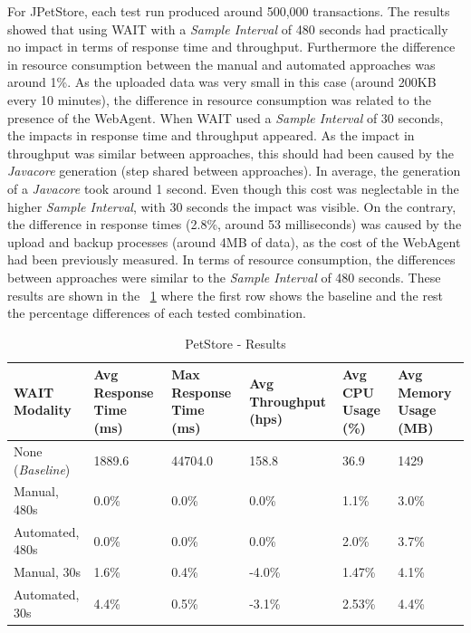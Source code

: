\documentclass[runningheads,a4paper]{llncs}
\begin{document}
For JPetStore, each test run produced around 500,000 transactions. The
results showed that using WAIT with a \emph{Sample Interval} of 480 seconds had
practically no impact in terms of response time and throughput. Furthermore the
difference in resource consumption between the manual and automated approaches
was around 1\%. As the uploaded data was very small in this case (around 200KB
every 10 minutes), the difference in resource consumption was related to the
presence of the WebAgent. When WAIT used a \emph{Sample Interval} of 30 seconds,
the impacts in response time and throughput appeared. As the impact in
throughput was similar between approaches, this should had been caused by the
\emph{Javacore} generation (step shared between approaches). In average, the
generation of a \emph{Javacore} took around 1 second. Even though this cost was
neglectable in the higher \emph{Sample Interval}, with 30 seconds the impact was
visible. On the contrary, the difference in response times (2.8\%, around 53
milliseconds) was caused by the upload and backup processes (around 4MB of
data), as the cost of the WebAgent had been previously measured. In terms of
resource consumption, the differences between approaches were similar to the
\emph{Sample Interval} of 480 seconds. These results are shown in the \tablename
~\ref{PetStore1} where the first row shows the baseline and the rest the
percentage differences of each tested combination.

\begin{table}[!h]
\caption{PetStore - Results}
\label{PetStore1}
\centering
\begin{tabular}{p{}|p{}|p{}|p{}|p{}|p{}}
\hline
\bfseries WAIT Modality & \bfseries Avg Response Time (ms)& \bfseries Max
Response Time (ms)& \bfseries Avg Throughput (hps)& \bfseries Avg CPU Usage
(\%) & \bfseries Avg Memory Usage (MB)\\
\hline
None (\emph{Baseline}) 	& 1889.6	& 44704.0	& 158.8 	& 36.9 		& 1429\\
Manual, 480s 			& 0.0\% 	& 0.0\%		& 0.0\%		& 1.1\% 	& 3.0\%\\
Automated, 480s 		& 0.0\%		& 0.0\%		& 0.0\% 	& 2.0\% 	& 3.7\%\\
Manual, 30s 			& 1.6\%		& 0.4\%		& -4.0\% 	& 1.47\% 	& 4.1\%\\
Automated, 30s 			& 4.4\%		& 0.5\%		& -3.1\% 	& 2.53\% 	& 4.4\%\\
\hline
\end{tabular}
\end{table}
\end{document}
